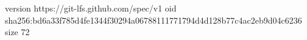 version https://git-lfs.github.com/spec/v1
oid sha256:bd6a33f785d4fe1344f30294a06788111771794d4d128b77c4ac2eb9d04c6236
size 72
